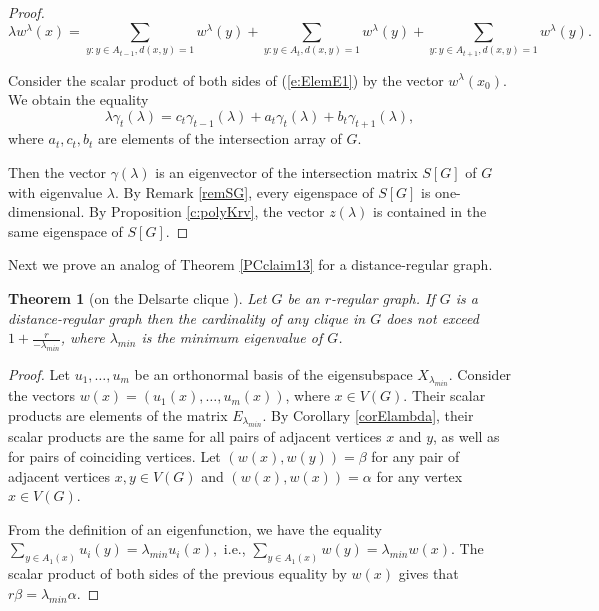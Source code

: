 \documentclass[11pt]{article}
\newtheorem{theorem}{Theorem}[section]
\theoremstyle{definition}
\begin{document}
{{\begin{proof}
\begin{equation}\label{e:ElemE1}\lambda w^\lambda(x)= \sum\limits_{y: y\in
A_{t-1},d(x,y)=1}w^\lambda(y)+ \sum\limits_{y: y\in
A_{t},d(x,y)=1}w^\lambda(y)+\sum\limits_{y: y\in
A_{t+1},d(x,y)=1}w^\lambda(y).\end{equation}

Consider the scalar product of both sides of (\ref{e:ElemE1}) by the vector
$w^\lambda(x_0)$.  We obtain the equality
\begin{equation}\label{eqdopDC}
\lambda
\gamma_t(\lambda)=c_t\gamma_{t-1}(\lambda)+a_t\gamma_t(\lambda)+b_t\gamma_{t+1}(\lambda),
\end{equation}
where $a_t,c_t,b_t$ are elements of  the intersection array of $G$.

Then the vector $\gamma(\lambda)$ is an eigenvector of the intersection matrix $S[G]$ of  $G$ with eigenvalue $\lambda$.  By
Remark \ref{remSG}, every eigenspace of  $S[G]$ is one-dimensional.  By Proposition \ref{c:polyKrv}, the vector $z(\lambda)$
is contained in the same eigenspace of $S[G]$.  \end{proof}

Next we prove an analog of Theorem \ref{PCclaim13} for a distance-regular
graph.

\begin{theorem}[on the Delsarte clique \cite{Godsil}]\label{PCclaim130}
Let $G$ be an $r$-regular graph. If $G$ is a distance-regular  graph  then the cardinality of any clique in $G$
does not exceed $1+\frac{r}{-\lambda_{min}}$, where $\lambda_{min}$ is the minimum
eigenvalue of $G$. \end{theorem}
\begin{proof}
Let $u_1,\dots,u_m$ be an orthonormal basis of the eigensubspace $X_{\lambda_{min}}$.
Consider the vectors
$w(x)=(u_1(x),\dots,u_m(x))$, where $x\in V(G)$. Their scalar
products are elements of the matrix $E_{\lambda_{min}}$. By
Corollary \ref{corElambda}, their scalar products are the same for
all pairs of adjacent vertices $x$ and $y$, as well as for pairs of coinciding
vertices. Let $(w(x),w(y))=\beta$ for any pair of adjacent vertices $x,y\in
V(G)$ and $(w(x),w(x))=\alpha$ for any vertex $x\in V(G)$.

From the definition of an eigenfunction, we have the equality\\ $
\sum\limits_{y\in A_1(x)}u_i(y)=\lambda_{min} u_i(x),$ i.e., $
\sum\limits_{y\in A_1(x)}w(y)=\lambda_{min} w(x)$. The scalar product of both sides of
the previous equality by $w(x)$ gives that
$r\beta=\lambda_{min}\alpha$.


\end{proof}}}
\end{document}
